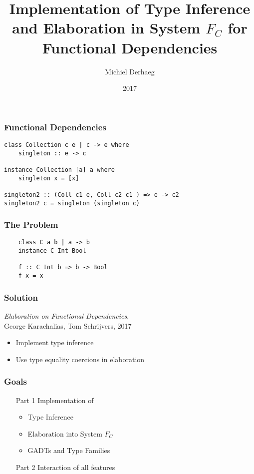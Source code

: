 \documentclass{beamer}
\title{Implementation of Type Inference and Elaboration in System $F_C$ for
Functional Dependencies}
\author{Michiel Derhaeg}
\institute{KULeuven}
\date{2017}
\begin{document}
\frame{\titlepage}

\begin{frame}[fragile]
    \frametitle{Functional Dependencies}
    \begin{lstlisting}
class Collection c e | c -> e where
    singleton :: e -> c

instance Collection [a] a where
    singleton x = [x]

singleton2 :: (Coll c1 e, Coll c2 c1 ) => e -> c2
singleton2 c = singleton (singleton c)
    \end{lstlisting}
\end{frame}

\begin{frame}[fragile]
    \frametitle{The Problem}
    \begin{lstlisting}
    class C a b | a -> b
    instance C Int Bool

    f :: C Int b => b -> Bool
    f x = x
    \end{lstlisting}
\end{frame}

\begin{frame}
    \frametitle{Solution}
    \textit{Elaboration on Functional Dependencies}, \\
    George Karachalias, Tom Schrijvers, 2017
    \begin{itemize}
        \item Implement type inference
        \item Use type equality coercions in elaboration
    \end{itemize}
\end{frame}

\begin{frame}
    \frametitle{Goals}
    \begin{itemize}
        \item[Part 1] Implementation of
            \begin{itemize}
                \item Type Inference
                \item Elaboration into System $F_C$
                \item GADTs and Type Families
            \end{itemize}
        \item[Part 2] Interaction of all features
            \begin{itemize}
            \end{itemize}
    \end{itemize}
\end{frame}
\end{document}
